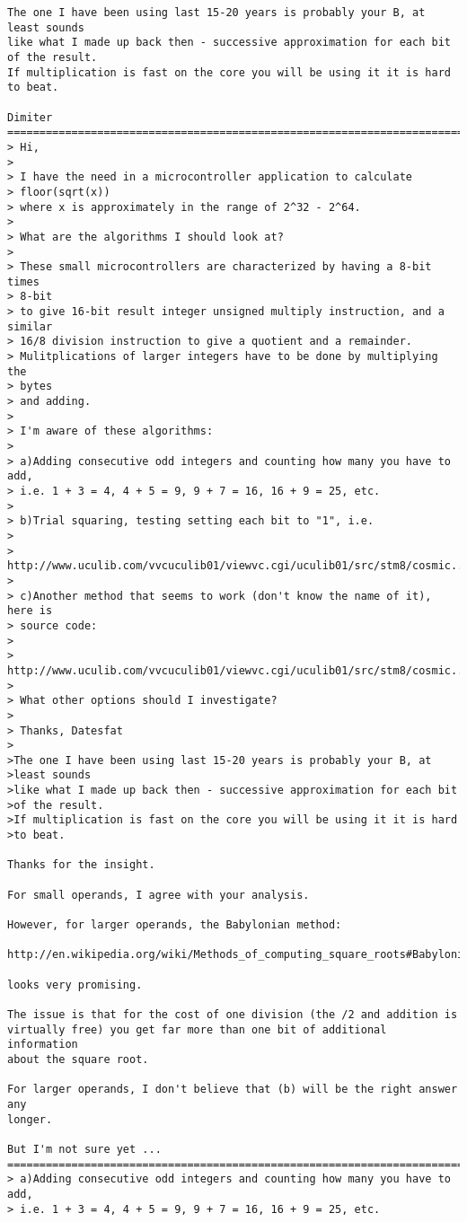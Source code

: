 \begin{tiny}
\begin{verbatim}
The one I have been using last 15-20 years is probably your B, at
least sounds
like what I made up back then - successive approximation for each bit
of the result.
If multiplication is fast on the core you will be using it it is hard
to beat.

Dimiter
================================================================================
> Hi,
>
> I have the need in a microcontroller application to calculate 
> floor(sqrt(x))
> where x is approximately in the range of 2^32 - 2^64.
>
> What are the algorithms I should look at?
>
> These small microcontrollers are characterized by having a 8-bit times 
> 8-bit
> to give 16-bit result integer unsigned multiply instruction, and a similar
> 16/8 division instruction to give a quotient and a remainder.
> Mulitplications of larger integers have to be done by multiplying the 
> bytes
> and adding.
>
> I'm aware of these algorithms:
>
> a)Adding consecutive odd integers and counting how many you have to add,
> i.e. 1 + 3 = 4, 4 + 5 = 9, 9 + 7 = 16, 16 + 9 = 25, etc.
>
> b)Trial squaring, testing setting each bit to "1", i.e.
>
> http://www.uculib.com/vvcuculib01/viewvc.cgi/uculib01/src/stm8/cosmic...
>
> c)Another method that seems to work (don't know the name of it), here is
> source code:
>
> http://www.uculib.com/vvcuculib01/viewvc.cgi/uculib01/src/stm8/cosmic...
>
> What other options should I investigate?
>
> Thanks, Datesfat
>
>The one I have been using last 15-20 years is probably your B, at
>least sounds
>like what I made up back then - successive approximation for each bit
>of the result.
>If multiplication is fast on the core you will be using it it is hard
>to beat.

Thanks for the insight.

For small operands, I agree with your analysis.

However, for larger operands, the Babylonian method:

http://en.wikipedia.org/wiki/Methods_of_computing_square_roots#Babylonian_method

looks very promising.

The issue is that for the cost of one division (the /2 and addition is 
virtually free) you get far more than one bit of additional information 
about the square root.

For larger operands, I don't believe that (b) will be the right answer any 
longer.

But I'm not sure yet ...
================================================================================
> a)Adding consecutive odd integers and counting how many you have to add, 
> i.e. 1 + 3 = 4, 4 + 5 = 9, 9 + 7 = 16, 16 + 9 = 25, etc.


\end{verbatim}
\end{tiny}
